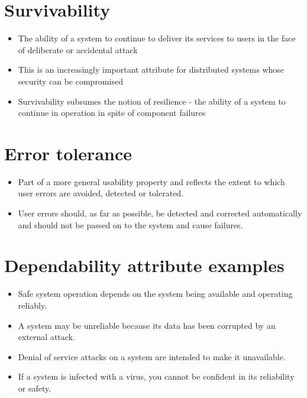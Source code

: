 \section{Survivability}
\begin{itemize}
\item The ability of a system to continue to deliver its services to users in the face of deliberate or accidental attack

\item This is an increasingly important attribute for distributed systems whose security can be compromised

\item Survivability subsumes the notion of resilience - the ability of a system to continue in operation in spite of component failures

\end{itemize}
\section{Error tolerance}
\begin{itemize}
\item Part of a more general usability property and reflects the extent to which user errors are avoided, detected or tolerated.

\item User errors should, as far as possible, be detected and corrected automatically and should not be passed on to the system and cause failures.


\end{itemize}
\section{Dependability attribute examples}
\begin{itemize}
\item Safe system operation depends on the system being available and operating reliably.

\item A system may be unreliable because its data has been corrupted by an external attack.

\item Denial of service attacks on a system are intended to make it unavailable.

\item If a system is infected with a virus, you cannot be confident in its reliability or safety.

\end{itemize}
